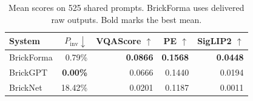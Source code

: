 \begin{table}[t]
\centering\small
\setlength{\tabcolsep}{3pt}
\begin{tabular}{lrrrr}
\toprule
System & $P_{\mathrm{inv}}\downarrow$ & VQAScore $\uparrow$ & PE $\uparrow$ & SigLIP2 $\uparrow$ \\
\midrule
BrickForma & 0.79\% & \textbf{0.0866} & \textbf{0.1568} & \textbf{0.0448} \\
BrickGPT & \textbf{0.00\%} & 0.0666 & 0.1440 & 0.0194 \\
BrickNet & 18.42\% & 0.0201 & 0.1187 & 0.0011 \\
\bottomrule
\end{tabular}
\caption{Mean scores on 525 shared prompts. BrickForma uses delivered raw outputs. Bold marks the best mean.}
\label{tab:main}
\end{table}
